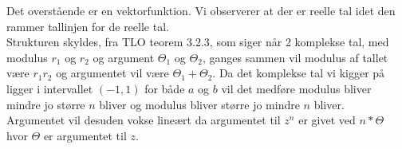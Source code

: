 \documentclass[12pt]{article}
\begin{document}
Det overstående er en vektorfunktion. Vi observerer at der er reelle tal idet den rammer tallinjen for de reelle tal.\\
Strukturen skyldes, fra TLO teorem 3.2.3, som siger når 2 komplekse tal, med modulus $r_1$ og $r_2$ og argument $\Theta_1$ og $\Theta_2$, ganges sammen vil modulus af tallet være $r_1r_2$ og argumentet vil være $\Theta_1+\Theta_2$. Da det komplekse tal vi kigger på ligger i intervallet $(-1,1)$ for både $a$ og $b$ vil det medføre modulus bliver mindre jo større $n$ bliver og modulus bliver større jo mindre $n$ bliver.\\
Argumentet vil desuden vokse lineært da argumentet til $z^n$ er givet ved $n*\Theta$ hvor $\Theta$ er argumentet til $z$.
\end{document}
